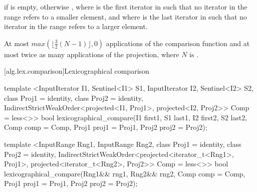 \begin{itemdescr}
\pnum
\returns
{} if  is empty, otherwise
, where  is
the first iterator in  such that no iterator in the range refers to a smaller
element, and where  is the last iterator in  such that no iterator
in the range refers to a larger element.

\pnum
\complexity
At most
$max(\lfloor{\frac{3}{2}} (N-1)\rfloor, 0)$
applications of the comparison function and
at most twice as many applications of the projection,
where $N$ is .
\end{itemdescr}

[alg.lex.comparison]{Lexicographical comparison}

%
\begin{itemdecl}
template <InputIterator I1, Sentinel<I1> S1, InputIterator I2, Sentinel<I2> S2,
    class Proj1 = identity, class Proj2 = identity,
    IndirectStrictWeakOrder<projected<I1, Proj1>, projected<I2, Proj2>> Comp = less<>>
  bool
    lexicographical_compare(I1 first1, S1 last1, I2 first2, S2 last2,
                            Comp comp = Comp{}, Proj1 proj1 = Proj1{}, Proj2 proj2 = Proj2{});

template <InputRange Rng1, InputRange Rng2, class Proj1 = identity,
    class Proj2 = identity,
    IndirectStrictWeakOrder<projected<iterator_t<Rng1>, Proj1>,
      projected<iterator_t<Rng2>, Proj2>> Comp = less<>>
  bool
    lexicographical_compare(Rng1&& rng1, Rng2&& rng2, Comp comp = Comp{},
                            Proj1 proj1 = Proj1{}, Proj2 proj2 = Proj2{});
\end{itemdecl}

